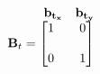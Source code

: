 \documentclass[preview]{standalone}
\begin{document}
\begin{align*}
\begin{array}{c}\begin{matrix}\hspace{1cm} \mathbf{b_{t_x}} & \mathbf{b_{t_y}} \end{matrix} \\\vspace*{4cm} \mathbf{B}_t = \begin{bmatrix} 1 & \quad 0 \\ \\0 & \quad 1 \end{bmatrix} \end{array}
\end{align*}
\end{document}
